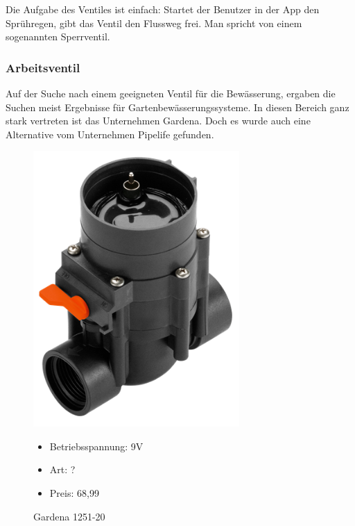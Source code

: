 Die Aufgabe des Ventiles ist einfach: Startet der Benutzer in der App den Sprühregen, gibt das Ventil den Flussweg frei. Man spricht von einem sogenannten Sperrventil. 

\subsubsection{Arbeitsventil}
\label{sec:ventilSuche}

Auf der Suche nach einem geeigneten Ventil für die Bewässerung, ergaben die Suchen meist Ergebnisse für Gartenbewässerungssysteme. In diesen Bereich ganz stark vertreten ist das Unternehmen Gardena. Doch es wurde auch eine Alternative vom Unternehmen Pipelife gefunden. 
\newpage

\begin{figure}[H]
\begin{minipage}[t]{0.45\textwidth}
\includegraphics[width=0.7\textwidth]{fig/VentilGardena}
\caption{Gardena 1251-20}

\begin{itemize}
	\item{Betriebsspannung: 9V}
	\item{Art: ?}
	\item{Preis: 68,99\textsf{\texteuro} \cite{preisGardena}}
\end{itemize}

\end{minipage}
\hspace{0.1\textwidth}
\begin{minipage}[t]{0.45\textwidth}



\end{minipage}
\end{figure}
